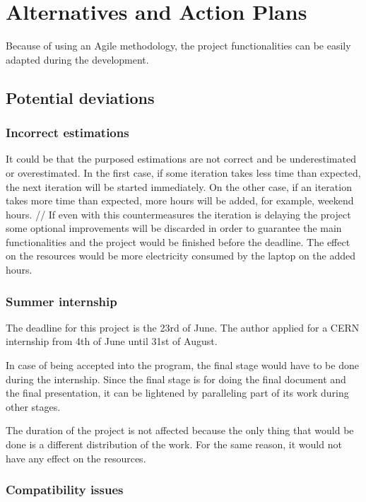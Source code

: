 \section{Alternatives and Action Plans}
Because of using an Agile methodology, the project functionalities can be easily adapted during the development. \\

\subsection{Potential deviations}
\subsubsection{Incorrect estimations}
It could be that the purposed estimations are not correct and be underestimated or overestimated. In the first case, if some iteration takes less time than expected, the next iteration will be started immediately. On the other case, if an iteration takes more time than expected, more hours will be added, for example, weekend hours. //
If even with this countermeasures the iteration is delaying the project some optional improvements will be discarded in order to guarantee the main functionalities and the project would be finished before the deadline. 
The effect on the resources would be more electricity consumed by the laptop on the added hours. 

\subsubsection{Summer internship}

The deadline for this project is the 23rd of June. 
The author applied for a CERN internship from 4th of June until 31st of August. 

In case of being accepted into the program, the final stage would have to be done during the internship. Since the final stage is for doing the final document and the final presentation, it can be lightened by paralleling part of its work during other stages.

The duration of the project is not affected because the only thing that would be done is a different distribution of the work. For the same reason, it would not have any effect on the resources.

\subsubsection{Compatibility issues}

